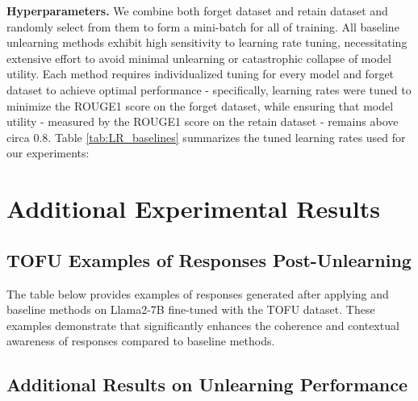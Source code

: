 

\textbf{Hyperparameters.} We combine both forget dataset and retain dataset and randomly select from them to form a mini-batch for all of \lunar training. All baseline unlearning methods exhibit high sensitivity to learning rate tuning, necessitating extensive effort to avoid minimal unlearning or catastrophic collapse of model utility. Each method requires individualized tuning for every model and forget dataset to achieve optimal performance - specifically, learning rates were tuned to minimize the ROUGE1 score on the forget dataset, while ensuring that model utility - measured by the ROUGE1 score on the retain dataset - remains above circa 0.8. Table \ref{tab:LR_baselines} summarizes the tuned learning rates used for our experiments:





\clearpage

\section{Additional Experimental Results}\label{app:add_exp_results}

\subsection{TOFU Examples of Responses Post-Unlearning} \label{app:tofu_examples}
The table below provides examples of responses generated after applying \lunar and baseline methods on Llama2-7B fine-tuned with the TOFU dataset. These examples demonstrate that \lunar significantly enhances the coherence and contextual awareness of responses compared to baseline methods. 


\clearpage
\subsection{Additional Results on Unlearning Performance}
\label{app:additional_results}

